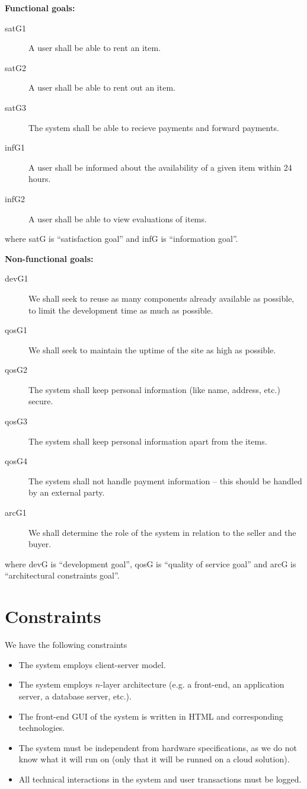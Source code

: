 \documentclass[a4paper,11pt]{report}
\begin{document}
\textbf{Functional goals:}
\begin{description}
  \item[satG1] A user shall be able to rent an item.
  \item[satG2] A user shall be able to rent out an item.
  \item[satG3] The system shall be able to recieve payments and forward payments.
  \item[infG1] A user shall be informed about the availability of a given item within 24 hours.
  \item[infG2] A user shall be able to view evaluations of items.
\end{description}
where satG is ``satisfaction goal'' and infG is ``information goal''.

\textbf{Non-functional goals:}
\begin{description}
  \item[devG1] We shall seek to reuse as many components already available as possible, to limit the development time as much as possible.
  \item[qosG1] We shall seek to maintain the uptime of the site as high as possible.
  \item[qosG2] The system shall keep personal information (like name, address, etc.) secure.
  \item[qosG3] The system shall keep personal information apart from the items. %
  \item[qosG4] The system shall not handle payment information --  this should be handled by an external party.
  \item[arcG1] We shall determine the role of the system in relation to the seller and the buyer.
\end{description}
where devG is ``development goal'', qosG is ``quality of service goal'' and arcG is ``architectural constraints goal''.


\section{Constraints}
\label{sec:constraints}
We have the following constraints
\begin{itemize}
  \item The system employs client-server model.
  \item The system employs $n$-layer architecture (e.g. a front-end, an application server, a database server, etc.).
  \item The front-end GUI of the system is written in HTML and corresponding technologies.
  \item The system must be independent from hardware specifications, as we do not know what it will run on (only that it will be runned on a cloud solution).
  \item All technical interactions in the system and user transactions must be logged.
\end{itemize}
\end{document}
